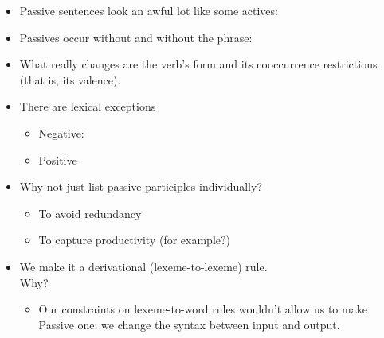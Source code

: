 \documentclass[a4paper,landscape,headrule,footrule]{foils}
\begin{document}
\begin{itemize}
\item Passive sentences look an awful lot like some actives:  
  \begin{exe}
    \ex {}
    \ex {}   
  \end{exe}
\item Passives occur without  and without the  phrase:
  \begin{exe}
    \ex {}
    \ex {}
\end{exe}
\end{itemize}




\begin{itemize}
\item What really changes are the verb’s form and its 
cooccurrence restrictions (that is, its valence).
\item There are lexical exceptions
  \begin{itemize}
  \item Negative:  
    \begin{exe}
      \ex {} 
      \ex  *
      \ex {}
      \ex *
    \end{exe}
  \item Positive
    \begin{exe}
      \ex {}
      \ex *
    \end{exe}
  \end{itemize}
\end{itemize}  


\begin{itemize}
\item Why not just list passive participles individually?
  \begin{itemize}
  \item To avoid redundancy
  \item To capture productivity (for example?)
  \end{itemize}
\item We make it a derivational (lexeme-to-lexeme) rule.  
  \\ Why?
  \begin{itemize}
  \item Our constraints on lexeme-to-word rules wouldn’t allow 
    us to make Passive one: we change the syntax between input and output.
  \end{itemize}
\end{itemize}  
\end{document}
